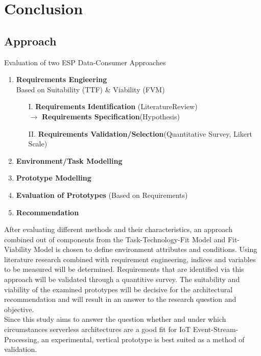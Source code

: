 \begin{minipage}{\textwidth}
    \section{Conclusion}
    
    \subsection{Approach}
    Evaluation of two ESP Data-Consumer Approaches
    \begin{enumerate}
        \item \textbf{Requirements Engieering}\\
            Based on Suitability (TTF) \& Viability (FVM)
            \begin{enumerate}
                \item[I.] \textbf{Requirements Identification} (LiteratureReview)\\
                    $\longrightarrow$ \textbf{Requirements Specification}(Hypothesis)
                \item[II.] \textbf{Requirements Validation/Selection}(Quantitative Survey, Likert Scale)
            \end{enumerate}
        \item \textbf{Environment/Task Modelling}
        \item \textbf{Prototype Modelling}
        \item \textbf{Evaluation of Prototypes} (Based on Requirements)
        \item \textbf{Recommendation}
    \end{enumerate}
    
    After evaluating different methods and their characteristics, an approach combined out of components from the Task-Technology-Fit Model and Fit-Viability Model is chosen to define environment attributes and conditions. Using literature research combined with requirement engineering, indices and variables to be measured will be determined. Requirements that are identified via this approach will be validated through a quantitive survey. The suitability and viability of the examined prototypes will be decisive for the architectural recommendation and will result in an answer to the research question and objective.\\
    Since this study aims to answer the question whether and under which circumstances serverless architectures are a good fit for IoT Event-Stream-Processing, an experimental, vertical prototype is best suited as a method of validation. 
    
\end{minipage}



